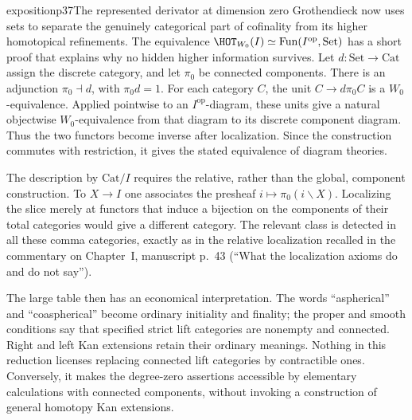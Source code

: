 \begin{dcomment}{exposition}{p37}{The represented derivator at dimension zero}
Grothendieck now uses sets to separate the genuinely categorical part of cofinality from its higher homotopical refinements. The equivalence $\HOT_{W_0}(I)\simeq\operatorname{Fun}(I^{\mathrm{op}},\mathrm{Set})$ has a short proof that explains why no hidden higher information survives. Let $d:\mathrm{Set}\longrightarrow\mathrm{Cat}$ assign the discrete category, and let $\pi_0$ be connected components. There is an adjunction $\pi_0\dashv d$, with $\pi_0d=1$. For each category $C$, the unit $C\longrightarrow d\pi_0C$ is a $W_0$-equivalence. Applied pointwise to an $I^{\mathrm{op}}$-diagram, these units give a natural objectwise $W_0$-equivalence from that diagram to its discrete component diagram. Thus the two functors become inverse after localization. Since the construction commutes with restriction, it gives the stated equivalence of diagram theories.

The description by $\mathrm{Cat}/I$ requires the relative, rather than the global, component construction. To $X\longrightarrow I$ one associates the presheaf $i\longmapsto\pi_0(i\backslash X)$. Localizing the slice merely at functors that induce a bijection on the components of their total categories would give a different category. The relevant class is detected in all these comma categories, exactly as in the relative localization recalled in the commentary on Chapter~I, manuscript p.~43 (``What the localization axioms do and do not say'').

The large table then has an economical interpretation. The words ``aspherical'' and ``coaspherical'' become ordinary initiality and finality; the proper and smooth conditions say that specified strict lift categories are nonempty and connected. Right and left Kan extensions retain their ordinary meanings. Nothing in this reduction licenses replacing connected lift categories by contractible ones. Conversely, it makes the degree-zero assertions accessible by elementary calculations with connected components, without invoking a construction of general homotopy Kan extensions.
\end{dcomment}

